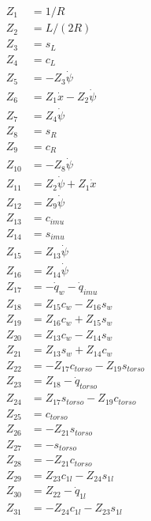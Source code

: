 \begin{multicols}{2}
\begin{align}
Z_{1} &= 1/R \nonumber \\
Z_{2} &= L/(2R) \nonumber \\
Z_{3} &= s_L \nonumber \\
Z_{4} &= c_L \nonumber \\
Z_{5} &=         -Z_{3}\dot{\psi} \nonumber \\
Z_{6} &=  Z_{1}\dot{x} - Z_{2}\dot{\psi} \nonumber \\
Z_{7} &=          Z_{4}\dot{\psi} \nonumber \\
Z_{8} &= s_R \nonumber \\ 
Z_{9} &= c_R \nonumber \\
Z_{10} &=          -Z_{8}\dot{\psi} \nonumber \\
Z_{11} &=   Z_{2}\dot{\psi} + Z_{1}\dot{x} \nonumber \\
Z_{12} &=           Z_{9}\dot{\psi} \nonumber \\
Z_{13} &= c_{imu} \nonumber \\
Z_{14} &= s_{imu} \nonumber \\
Z_{15} &= Z_{13}\dot{\psi} \nonumber \\
Z_{16} &= Z_{14}\dot{\psi} \nonumber \\
Z_{17} &= -\dot{q}_{w}-\dot{q}_{imu} \nonumber \\ 
Z_{18} &= Z_{15}c_{w}-Z_{16}s_{w} \nonumber \\ 
Z_{19} &= Z_{16}c_{w}+Z_{15}s_{w} \nonumber \\
Z_{20} &= Z_{13}c_{w}-Z_{14}s_{w} \nonumber \\
Z_{21} &= Z_{13}s_{w}+Z_{14}c_{w} \nonumber \\
Z_{22} &= -Z_{17}c_{torso}-Z_{19}s_{torso} \nonumber \\
Z_{23} &= Z_{18}-\dot{q}_{torso} \nonumber \\
Z_{24} &= Z_{17}s_{torso}-Z_{19}c_{torso} \nonumber \\
Z_{25} &= c_{torso} \nonumber \\
Z_{26} &= -Z_{21}s_{torso} \nonumber \\
Z_{27} &= -s_{torso} \nonumber \\
Z_{28} &= -Z_{21}c_{torso} \nonumber \\
Z_{29} &=    Z_{23}c_{1l} - Z_{24}s_{1l} \nonumber \\
Z_{30} &=                       Z_{22} - \dot{q}_{1l} \nonumber \\
Z_{31} &=  - Z_{24}c_{1l} - Z_{23}s_{1l} \nonumber \\

\end{align}
\end{multicols}
